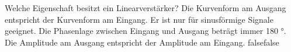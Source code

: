     {Welche Eigenschaft besitzt ein Linearverstärker?}
    {Die Kurvenform am Ausgang entspricht der Kurvenform am Eingang.}
    {Er ist nur für sinusförmige Signale geeignet.}
    {Die Phasenlage zwischen Eingang und Ausgang beträgt immer 180 °.}
    {Die Amplitude am Ausgang entspricht der Amplitude am Eingang.}
    {false}{false}
